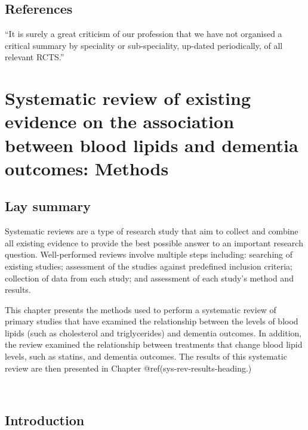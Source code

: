 \documentclass[a4paper, twoside]{templates/ociamthesis}
\begin{document}
\newpage

\hypertarget{references-1}{%
\section{References}\label{references-1}}

\begin{savequote}
``It is surely a great criticism of our profession that we have not
organised a critical summary by speciality or sub-speciality, up-dated
periodically, of all relevant RCTS.''
\end{savequote}



\hypertarget{sys-rev-methods-heading}{%
\chapter{Systematic review of existing evidence on the association between blood lipids and dementia outcomes: Methods}\label{sys-rev-methods-heading}}

\minitoc 

\hypertarget{lay-summary-2}{%
\section{Lay summary}\label{lay-summary-2}}

Systematic reviews are a type of research study that aim to collect and combine all existing evidence to provide the best possible answer to an important research question. Well-performed reviews involve multiple steps including: searching of existing studies; assessment of the studies against predefined inclusion criteria; collection of data from each study; and assessment of each study's method and results.

This chapter presents the methods used to perform a systematic review of primary studies that have examined the relationship between the levels of blood lipids (such as cholesterol and triglycerides) and dementia outcomes. In addition, the review examined the relationship between treatments that change blood lipid levels, such as statins, and dementia outcomes. The results of this systematic review are then presented in Chapter @ref(sys-rev-results-heading.)

~

\hypertarget{sys-rev-intro}{%
\section{Introduction}\label{sys-rev-intro}}
\end{document}
